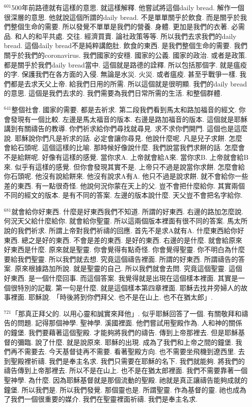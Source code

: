 \documentclass{book}
\begin{document}
$^{601}$500年前路德就有這樣的意思.
就這樣解釋.
他嘗試將這個daily bread.
解作一個很深層的意思.
他就說這個所謂的daily bread.
不是單單關乎於飲食.
而是關乎於我們整個生命的需要.
所以發覺不單單是我們的營養.
身體.
更加是我們的衣著.
必需品.
和人的和平共處.
交往.
經濟買賣.
論社政策等等.
所以我們去求我們的daily bread.
這個daily bread不是純粹講飽肚.
飲食的東西.
是我們整個生命的需要.
我們關乎於我們的coronavirus.
我們國家的安穩.
國家的公義.
國家的政治.
或者是政策.
都是關乎於我們daily bread當中.
這個就是路德的詮釋.
所以包括那個字.
就是瘟疫的字.
保護我們在各方面的入侵.
無論是水災.
火災.
或者瘟疫.
甚至乎戰爭一樣.
我們都是去求天父上帝.
給我們日用的所需.
所以這個就是很明顯.
我們的daily bread的意思.
這個是我們去求的.
我們需要為我們日常所需的生活.
和整個群體.

$^{641}$整個社會.
國家的需要.
都是去祈求.
第二段我們看到馬太和路加福音的經文.
你會發現有一個比較.
左邊是馬太福音的版本.
右邊是路加福音的版本.
這個就是耶穌講到有關禱告的教導.
你們祈求給你們尋找就尋見.
求不求你們開門.
這個也是這麼說.
耶穌說你們凡是祈求的話.
必定會讓你尋見.
他說什麼呢.
凡是兒子求餅.
怎麼會給石頭呢.
這個這樣的比喻.
那時候好像說什麼.
我們說當我們求餅的話.
怎麼會不是給餅呢.
好像有這樣的感覺.
當你求A.
上帝就會給A來.
當你求B.
上帝就會給B來.
似乎有這樣的感覺.
但你會發現其實不是.
上帝只不過是說當你求餅.
怎麼會給你石頭呢.
他沒有說給餅來.
他沒有說求A有A.
他只不過是說求餅.
就不會給你一些差的東西.
有一點很奇怪.
他說何況你蒙在天上的父.
豈不會把什麼給你.
其實兩個不同的經文的版本.
是有不同的答案.
左邊的版本說什麼.
天父豈不會把名字給你.

$^{681}$就會給你好東西.
什麼是好東西我們不知道.
所謂的好東西.
右邊的路加怎麼說.
何況天父給什麼給你.
就會給你聖靈.
所以這兩個版本裡面有很不同的答案.
馬太所說的我們祈求.
所謂上帝對我們祈禱的回應.
首先不是求A就有A.
什麼東西給你好東西.
總之是好的東西.
不會是差的東西.
是好的東西.
右邊的是什麼.
就會給原來好東西是什麼.
原來就是聖靈.
你會覺得有點奇怪.
你會覺得聖靈.
你不明白為什麼要給我們聖靈.
所以我們就去想.
究竟這個禱告裡面.
所謂的好東西.
所謂禱告的答案.
原來根據路加所說.
就是聖靈的自己.
所以我們就會去問.
究竟這個聖靈.
這個好東西.
是一個什麼回事.
而這個答案.
我覺得就是出現在這個樣本裡面.
其實是一個很特別的記載.
第一句是什麼.
就是這個樣本第四章裡面.
耶穌去找井旁婦人的故事裡面.
耶穌說.
「時後將到你們拜父.
也不是在山上.
也不在猶太郎」.

$^{721}$「那真正拜父的.
以用心靈和誠實來拜他」.
似乎耶穌回答了一個.
有關敬拜和禱告的問題.
記得那個神學.
聖神學.
溪國裡面.
他們嘗試用聖殿作為.
人和神的關係的鐘堡.
我們要藉著這個聖殿.
才能夠將我們的禱告.
傳到上帝那裡去.
但是耶穌基督的彌臨.
說了什麼.
就是說原來.
耶穌的出現.
成為了我們和上帝之間的鐘堡.
我們再不需要去.
今天基督徒再不需要.
看著聖殿方向.
也不需要坐飛機到遼西里.
去到聖殿裡祈禱.
我們是奉主名求.
我們只需要在耶穌的名下.
我們就能夠.
將我們的禱告傳到上帝那裡去.
所以不是在山上.
也不是在猶太郎裡面.
我們不需要靠著一個聖神學.
為什麼.
因為耶穌基督就是那個流動的聖殿.
祂就是真正讓禱告能夠成就的鐘堡.
所以我們是.
所以我們發覺.
那個靈也是.
所謂聖靈.
作為基督的靈.
祂也成為了我們一個很重要的媒介.
我們在聖靈裡面祈禱.
我們是奉主名求.
\end{document}
